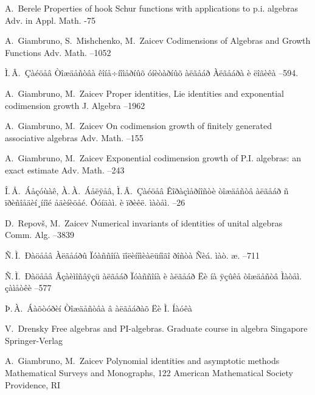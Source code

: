 \documentclass{article}
\numberwithin{equation}{section}
\theoremstyle{plain}
\theoremstyle{definition}
\begin{document}
\begin{thebibliography}{99}
\by A.~Berele
\paper Properties of hook Schur functions with applications to p.i. algebras
\jour Adv. in Appl. Math.
-75

\by A.~Giambruno, S.~Mishchenko, M.~Zaicev
\paper Codimensions of Algebras and Growth Functions
\jour Adv. Math. 
--1052

\by Ì.\,Â.~Çàéöåâ
\paper Òîæäåñòâà êîíå÷íîìåðíûõ óíèòàðíûõ àëãåáð
\jour Àëãåáðà è ëîãèêà
--594.

\by A.~Giambruno, M.~Zaicev
\paper Proper identities, Lie identities and exponential codimension growth
\jour J. Algebra
--1962

\by A.~Giambruno, M.~Zaicev 
\paper On codimension growth of finitely generated associative algebras
\jour Adv. Math. 
--155

\by A.~Giambruno, M.~Zaicev 
\paper Exponential codimension growth of P.I. algebras: an exact estimate
\jour Adv. Math. 
--243

\by Î.\,Å.~Áåçóùàê, À.\,À.~Áåëÿåâ, Ì.\,Â.~Çàéöåâ
\paper Êîðàçìåðíîñòè òîæäåñòâ àëãåáð ñ ïðèñîåäèí¸ííîé åäèíèöåé. 
\jour Ôóíäàì. è ïðèêë. ìàòåì.
--26

\by D.~Repov\v s, M.~Zaicev
\paper Numerical invariants of identities of unital algebras
\jour Comm. Alg.
--3839

\by Ñ.\,Ì.~Ðàöååâ 
\paper Àëãåáðû Ïóàññîíà ïîëèíîìèàëüíîãî ðîñòà
\jour Ñèá. ìàò. æ.
--711

\by Ñ.\,Ì.~Ðàöååâ 
\paper Âçàèìîñâÿçü àëãåáð Ïóàññîíà è àëãåáð Ëè íà ÿçûêå òîæäåñòâ
\jour Ìàòåì. çàìåòêè
--577

\by Þ.\,À.~Áàõòóðèí
\book Òîæäåñòâà â àëãåáðàõ Ëè 
\publaddr Ì.
\publ Íàóêà

\by V.~Drensky
\book Free algebras and PI-algebras. Graduate course in algebra 
\publaddr Singapore
\publ Springer-Verlag

\by A.~Giambruno, M.~Zaicev
\book Polynomial identities and asymptotic methods
\bookinfo Mathematical Surveys and Monographs, 122
\publ American Mathematical Society
\publaddr Providence, RI


\end{thebibliography}
\end{document}
